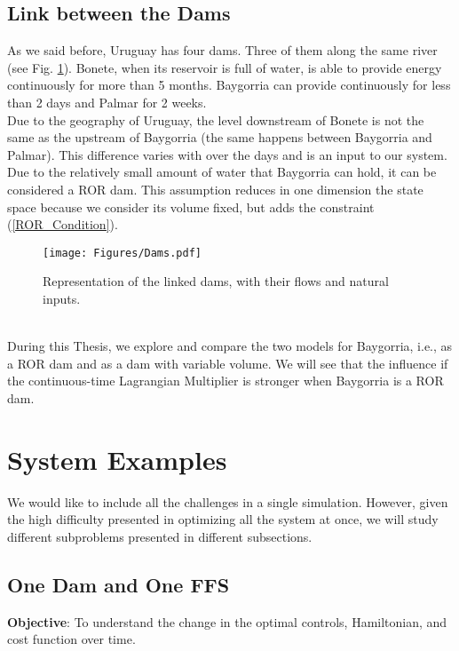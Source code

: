 \subsection{Link between the Dams}\label{Subsection_LinkDams}

As we said before, Uruguay has four dams. Three of them along the same river (see Fig. \ref{Dams}). Bonete, when its reservoir is full of water, is able to provide energy continuously for more than 5 months. Baygorria can provide continuously for less than 2 days and Palmar for 2 weeks.\\
Due to the geography of Uruguay, the level downstream of Bonete is not the same as the upstream of Baygorria (the same happens between Baygorria and Palmar). This difference varies with over the days and is an input to our system.\\
Due to the relatively small amount of water that Baygorria can hold, it can be considered a ROR dam. This assumption reduces in one dimension the state space because we consider its volume fixed, but adds the constraint (\ref{ROR_Condition}).
\begin{figure}[ht!]
\centering
\texttt{[image: Figures/Dams.pdf]}
\caption{Representation of the linked dams, with their flows and natural inputs.}
\label{Dams}
\end{figure}\\
During this Thesis, we explore and compare the two models for Baygorria, i.e., as a ROR dam and as a dam with variable volume. We will see that the influence if the continuous-time Lagrangian Multiplier is stronger when Baygorria is a ROR dam.

\section{System Examples}

We would like to include all the challenges in a single simulation. However, given the high difficulty presented in optimizing all the system at once, we will study different subproblems presented in different subsections.

\subsection{One Dam and One FFS} \label{First_Subproblem}

\textbf{Objective}: To understand the change in the optimal controls, Hamiltonian, and cost function over time.\\

